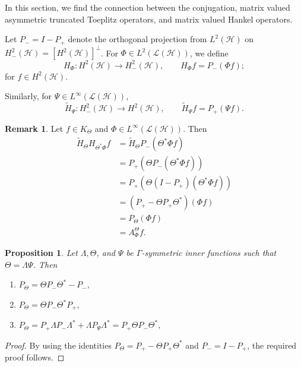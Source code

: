 \documentclass[12pt]{amsart}
\numberwithin{equation}{section}
\newcommand{\hsp}{\mathcal{H}}
\newcommand{\oL }{\mathcal{L}(\hsp) }
\newtheorem{proposition}[theorem]{Proposition}
\theoremstyle{definition}
\newtheorem{remark}[theorem]{Remark}
\numberwithin{equation}{section}
\begin{document}
In this section, we find the connection between the conjugation, matrix valued asymmetric truncated Toeplitz operators, and matrix valued Hankel operators.

Let $P_{-}=I-P_{+}$ denote the orthogonal projection from $L^{2}(\hsp)$ on $H_{-}^{2}(\hsp)=[H^{2}(\hsp)]^{\perp}$. For $\Phi\in L^{2}(\oL)$, we define
$$H_{\Phi}: H^{2}(\hsp)\to H^{2}_{-}(\hsp),\quad \quad H_{\Phi}f=P_{-}(\Phi f);$$
for $f\in H^{2}(\hsp)$.

Similarly, for $\Psi\in L^{\infty}(\oL)$,
$$\widetilde{H}_{\Psi}:  H^{2}_{-}(\hsp)\to H^{2}(\hsp),\quad \quad \widetilde{H}_{\Psi}f=P_{+}(\Psi f).$$

\begin{remark}
Let $f\in K_{\Theta}$ and $\Phi\in L^{\infty}(\oL)$. Then
\begin{align*}
\widetilde{H}_{\Theta}H_{\Theta^{*}\Phi}f
&=\widetilde{H}_{\Theta}P_{-}(\Theta^{*}\Phi f)\\
&=P_{+}(\Theta P_{-}(\Theta^{*}\Phi f))\\
&=P_{+}(\Theta (I-P_{+})(\Theta^{*}\Phi f))\\
&=(P_{+}-\Theta P_{+}\Theta^{*})(\Phi f)\\
&=P_{\Theta}(\Phi f)\\
&=A_{\Phi}^{\Theta}f.
\end{align*}
\end{remark}


\begin{proposition}
Let $\Lambda, \Theta$, and $\Psi$ be $\Gamma$-symmetric inner functions such that $\Theta=\Lambda\Psi$. Then
\begin{enumerate}[(1)]
    \item $P_{\Theta}=\Theta P_{-}\Theta^{*}-P_{-},$
    \item $P_{\Theta}=\Theta P_{-}\Theta^{*}P_{+},$
    \item $P_{\Theta}=P_{+}\Lambda P_{-}\Lambda^{*}+\Lambda P_{\Psi} \Lambda^{*}=P_{+}\Theta P_{-}\Theta^{*},$
\end{enumerate}
\end{proposition}
\begin{proof}
By using the identities $P_{\Theta}=P_{+}-\Theta P_{+}\Theta^{*}$ and $P_{-}=I-P_{+}$, the required proof follows.
\end{proof}


\medskip
\end{document}
